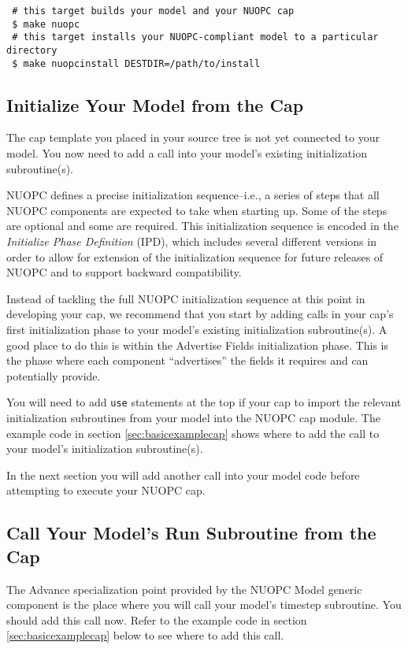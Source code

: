 \begin{verbatim} 
 # this target builds your model and your NUOPC cap 
 $ make nuopc
 # this target installs your NUOPC-compliant model to a particular directory
 $ make nuopcinstall DESTDIR=/path/to/install
\end{verbatim}


\subsection{Initialize Your Model from the Cap}
\label{sec:initmodelfromcap}
The cap template you placed in your source tree is not yet connected
to your model.  You now need to add a call into your model's existing
initialization subroutine(s).

NUOPC defines a precise initialization sequence--i.e., a series of
steps that all NUOPC components are expected to take when starting
up.  Some of the steps are optional and some are required.
This initialization sequence is encoded in the \emph{Initialize Phase
Definition} (IPD), which includes several different versions in
order to allow for extension of the initialization sequence for
future releases of NUOPC and to support backward compatibility.

Instead of tackling the full NUOPC initialization sequence at this point in
developing your cap, we recommend that you start by adding calls in your cap's
first initialization phase to your model's existing initialization subroutine(s).
A good place to do this is within the Advertise Fields initialization phase.
This is the phase where each component ``advertises'' the fields it
requires and can potentially provide.  

You will need to add {\tt use} statements at the top if your cap to import the relevant
initialization subroutines from your model into the NUOPC cap module.
The example code in section \ref{sec:basicexamplecap} shows where to add the 
call to your model's initialization subroutine(s).

In the next section you will add another call into your model code
before attempting to execute your NUOPC cap.


\subsection{Call Your Model's Run Subroutine from the Cap}
\label{sec:callrunfromcap}
The Advance specialization point provided by the NUOPC Model
generic component is the place where you will call your
model's timestep subroutine.  You should add this call now. 
Refer to the example code in section \ref{sec:basicexamplecap} 
below to see where to add this call.

